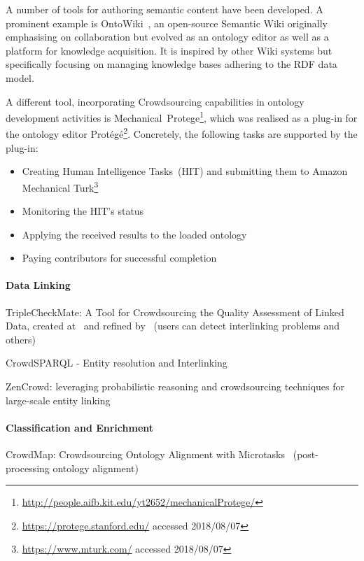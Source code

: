 A number of tools for authoring semantic content have been developed. A prominent example is OntoWiki~\cite{auer2006}, an open-source Semantic Wiki originally emphasising on collaboration but evolved as an ontology editor as well as a platform for knowledge acquisition. It is inspired by other Wiki systems but specifically focusing on managing knowledge bases adhering to the RDF data model. 

A different tool, incorporating Crowdsourcing capabilities in ontology development activities is Mechanical~Protege\footnote{\url{http://people.aifb.kit.edu/yt2652/mechanicalProtege/}}, which was realised as a plug-in for the ontology editor Protégé\footnote{\url{https://protege.stanford.edu/} accessed 2018/08/07}. Concretely, the following tasks are supported by the plug-in:
\begin{itemize}
	\item Creating Human Intelligence Tasks~(HIT) and submitting them to Amazon Mechanical Turk\footnote{\url{https://www.mturk.com/} accessed 2018/08/07}
	\item Monitoring the HIT's status
	\item Applying the received results to the loaded ontology
	\item Paying contributors for successful completion
\end{itemize}





\paragraph{Data Linking}
TripleCheckMate: A Tool for Crowdsourcing the Quality Assessment of Linked Data, created at~\cite{acosta2013} and refined by~\cite{kontokostas2013}  (users can detect interlinking problems and others)

CrowdSPARQL - Entity resolution and Interlinking~\cite{acosta2012}

ZenCrowd: leveraging probabilistic reasoning and crowdsourcing techniques for large-scale entity linking~\cite{demartini2012}

\paragraph{Classification and Enrichment}
CrowdMap: Crowdsourcing Ontology Alignment with Microtasks~\cite{sarasua2012} (post-processing ontology alignment)

